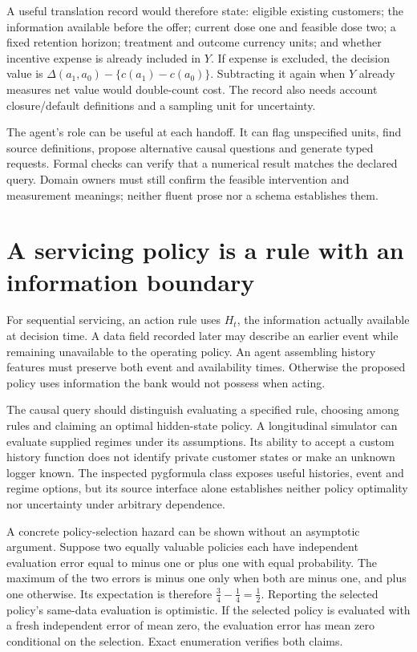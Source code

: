 A useful translation record would therefore state: eligible existing customers;
the information available before the offer; current dose one and feasible dose
two; a fixed retention horizon; treatment and outcome currency units; and
whether incentive expense is already included in $Y$. If expense is excluded,
the decision value is $\Delta(a_1,a_0)-\{c(a_1)-c(a_0)\}$. Subtracting it again
when $Y$ already measures net value would double-count cost. The record also
needs account closure/default definitions and a sampling unit for uncertainty.

The agent's role can be useful at each handoff. It can flag unspecified units,
find source definitions, propose alternative causal questions and generate
typed requests. Formal checks can verify that a numerical result matches the
declared query. Domain owners must still confirm the feasible intervention and
measurement meanings; neither fluent prose nor a schema establishes them.

\section{A servicing policy is a rule with an information boundary}

For sequential servicing, an action rule uses $H_t$, the information actually
available at decision time. A data field recorded later may describe an earlier
event while remaining unavailable to the operating policy. An agent assembling
history features must preserve both event and availability times. Otherwise
the proposed policy uses information the bank would not possess when acting.

The causal query should distinguish evaluating a specified rule, choosing among
rules and claiming an optimal hidden-state policy. A longitudinal simulator can
evaluate supplied regimes under its assumptions. Its ability to accept a custom
history function does not identify private customer states or make an unknown
logger known. The inspected pygformula class exposes useful histories, event
and regime options, but its source interface alone establishes neither policy
optimality nor uncertainty under arbitrary dependence. \citep{v13_sw_pygformula}

A concrete policy-selection hazard can be shown without an asymptotic argument.
Suppose two equally valuable policies each have independent evaluation error
equal to minus one or plus one with equal probability. The maximum of the two
errors is minus one only when both are minus one, and plus one otherwise.
Its expectation is therefore $\tfrac34-\tfrac14=\tfrac12$. Reporting the
selected policy's same-data evaluation is optimistic. If the selected policy
is evaluated with a fresh independent error of mean zero, the evaluation error
has mean zero conditional on the selection. Exact enumeration verifies both
claims. \citep{v13_project_exact}

